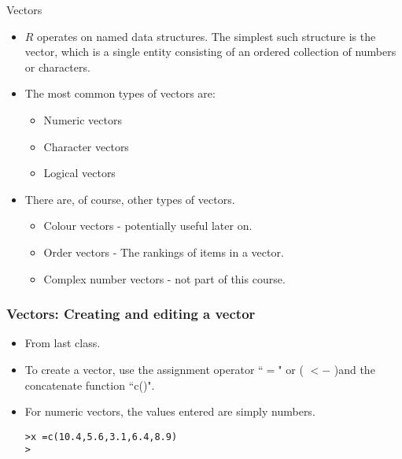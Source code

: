 

\begin{frame}[fragile]{Vectors}
\begin{itemize}
\item $R$ operates on named data structures. The simplest such
structure is the vector, which is a single entity consisting of an
ordered collection of numbers or characters.

\item The most common types of vectors are:
\begin{itemize}
\item Numeric vectors \item Character vectors \item Logical
vectors
\end{itemize}

\item There are, of course, other types of vectors.
\begin{itemize}
\item Colour vectors - potentially useful later on.
\item Order vectors - The rankings of items in a vector.
\item Complex number vectors - not part of this course.
\end{itemize}
\end{itemize}
\end{frame}
\begin{frame}[fragile]
\frametitle{Vectors: Creating and editing a vector}
\begin{itemize}
\item From last class.
\item To create a vector, use the assignment operator ``$=$" or ( $<-$ )and
the concatenate function ``c()". \item For numeric vectors, the values
entered are simply numbers.
\begin{framed}
\begin{verbatim}
>x =c(10.4,5.6,3.1,6.4,8.9)
>
\end{verbatim}
\end{framed}
\end{itemize}
\end{frame}



